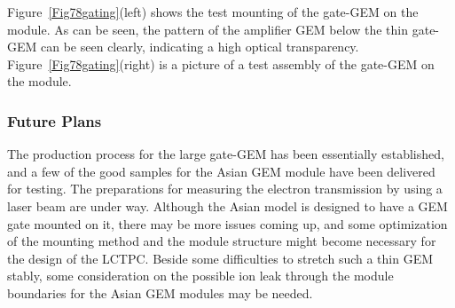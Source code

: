 Figure~\ref{Fig78gating}(left) shows the test mounting of the gate-GEM on the module. As can be seen,
the pattern of the amplifier GEM below the thin gate-GEM can be seen clearly, indicating a  high optical transparency.
Figure~\ref{Fig78gating}(right) is a picture of a test assembly of the gate-GEM on the module.

\subsubsection{Future Plans}

The production process for the large gate-GEM has been essentially established,
and a few of the good samples for the Asian GEM module have been delivered for testing.
The preparations for measuring the electron transmission by using a laser beam are under way.
Although the Asian model is designed to have a GEM gate mounted on it,
there may be more issues coming up, and some optimization of the mounting method and the module structure
might become necessary for the design of the LCTPC. Beside some difficulties to stretch such a thin
GEM stably, some consideration on the possible ion leak through the module boundaries
for the Asian GEM modules may be needed.
